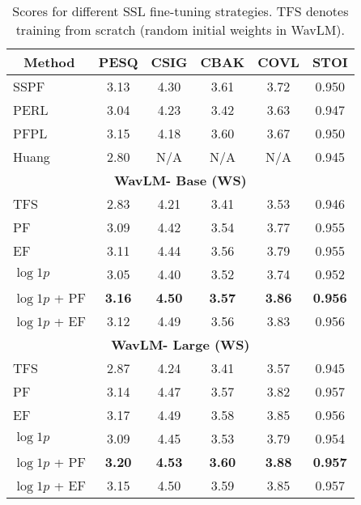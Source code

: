 \documentclass[a4paper]{article}
\begin{document}
\begin{table}[th]
  \caption{Scores for different SSL fine-tuning strategies. TFS denotes training from scratch (random initial weights in WavLM).}
  \label{table:2}
  \centering
  \begin{tabular}{l@{}ccccc}
    \toprule
    \multicolumn{1}{c}{\textbf{Method}} & \multicolumn{1}{c}{\textbf{PESQ}} & \multicolumn{1}{c}{\textbf{CSIG}} & \multicolumn{1}{c}{\textbf{CBAK}} & \multicolumn{1}{c}{\textbf{COVL}} & \multicolumn{1}{c}{\textbf{STOI}} \\
    \midrule
    SSPF~\cite{qiu2021self}                  & 3.13   & 4.30   & 3.61  & 3.72    & 0.950 \\
    PERL~\cite{kataria2021perceptual}  & 3.04   & 4.23   & 3.42   & 3.63   & 0.947 \\
    PFPL~\cite{hsieh2020improving}           & 3.15   & 4.18   & 3.60   & 3.67   & 0.950 \\
    Huang~\cite{ZiliSSL}                          & 2.80   & N/A      & N/A      & N/A      & 0.945 \\
    \midrule
\multicolumn{6}{c}{\textbf{WavLM- Base (WS)}}\\
    \cmidrule(r){1-6}
    TFS     & 2.83   &4.21  & 3.41   &3.53  & 0.946 \\
    PF  & 3.09   & 4.42   & 3.54   & 3.77   & 0.955 \\
    EF  & 3.11   & 4.44   & 3.56   & 3.79   & 0.955 \\
    $\log 1p$    & 3.05   & 4.40   & 3.52  & 3.74    & 0.952 \\
    $\log 1p$ + PF   & \textbf{3.16}  & \textbf{4.50}  & \textbf{3.57}   & \textbf{3.86}   & \textbf{0.956} \\
    $\log 1p$ + EF   & 3.12  & 4.49  & 3.56   & 3.83   & 0.956 \\
    


    \cmidrule(r){1-6}
    \multicolumn{6}{c}{\textbf{WavLM- Large (WS)}}\\
    \cmidrule(r){1-6}
    TFS     & 2.87   &4.24  & 3.41   &3.57  & 0.945 \\
    PF  & 3.14 & 4.47 & 3.57 & 3.82 & 0.957 \\
    EF  & 3.17 & 4.49 & 3.58 & 3.85 & 0.956 \\
    $\log 1p$  & 3.09 & 4.45 & 3.53 & 3.79 & 0.954 \\
    $\log 1p$ + PF   & \textbf{3.20} & \textbf{4.53} & \textbf{3.60} & \textbf{3.88} & \textbf{0.957} \\
    $\log 1p$ + EF  & 3.15 & 4.50 & 3.59 & 3.85 & 0.957 \\
    

    \bottomrule
  \end{tabular}
\end{table}
\end{document}
